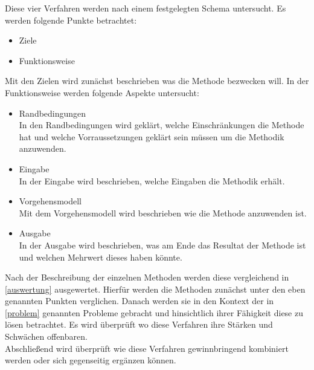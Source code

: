 Diese vier Verfahren werden nach einem festgelegten Schema untersucht. Es werden folgende Punkte betrachtet:\\

\begin{itemize}
\item Ziele
\item Funktionsweise\\
\end{itemize}

Mit den Zielen wird zunächst beschrieben was die Methode bezwecken will. In der Funktionsweise werden folgende Aspekte untersucht:\\

\begin{itemize}
\item Randbedingungen \\
In den Randbedingungen wird geklärt, welche Einschränkungen die Methode hat und welche Vorraussetzungen geklärt sein müssen um die Methodik anzuwenden.
\item Eingabe \\
In der Eingabe wird beschrieben, welche Eingaben die Methodik erhält.
\item Vorgehensmodell \\
Mit dem Vorgehensmodell wird beschrieben wie die Methode anzuwenden ist.
\item Ausgabe \\
In der Ausgabe wird beschrieben, was am Ende das Resultat der Methode ist und welchen Mehrwert dieses haben könnte.\\
\end{itemize}

Nach der Beschreibung der einzelnen Methoden werden diese vergleichend in \ref{auswertung} ausgewertet. Hierfür werden die Methoden zunächst unter den eben genannten Punkten verglichen. Danach werden sie in den Kontext der in \ref{problem} genannten Probleme gebracht und hinsichtlich ihrer Fähigkeit diese zu lösen betrachtet. Es wird überprüft wo diese Verfahren ihre Stärken und Schwächen offenbaren. \\

Abschließend wird überprüft wie diese Verfahren gewinnbringend kombiniert werden oder sich gegenseitig ergänzen können. 